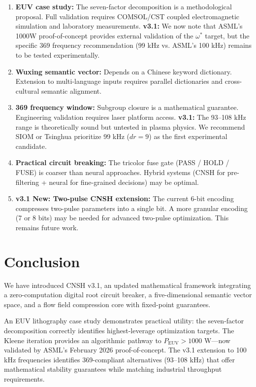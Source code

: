 \documentclass[twocolumn]{article}
\begin{document}
\begin{enumerate}
  \item \textbf{EUV case study:} The seven-factor decomposition is a methodological proposal. Full validation requires COMSOL/CST coupled electromagnetic simulation and laboratory measurements. \textbf{v3.1:} We now note that ASML's 1000W proof-of-concept provides external validation of the $\omega^*$ target, but the specific 369 frequency recommendation (99 kHz vs. ASML's 100 kHz) remains to be tested experimentally.

  \item \textbf{Wuxing semantic vector:} Depends on a Chinese keyword dictionary. Extension to multi-language inputs requires parallel dictionaries and cross-cultural semantic alignment.

  \item \textbf{369 frequency window:} Subgroup closure is a mathematical guarantee. Engineering validation requires laser platform access. \textbf{v3.1:} The 93–108 kHz range is theoretically sound but untested in plasma physics. We recommend SIOM or Tsinghua prioritize 99 kHz ($dr=9$) as the first experimental candidate.

  \item \textbf{Practical circuit breaking:} The tricolor fuse gate (PASS / HOLD / FUSE) is coarser than neural approaches. Hybrid systems (CNSH for pre-filtering + neural for fine-grained decisions) may be optimal.

  \item \textbf{v3.1 New: Two-pulse CNSH extension:} The current 6-bit encoding compresses two-pulse parameters into a single bit. A more granular encoding (7 or 8 bits) may be needed for advanced two-pulse optimization. This remains future work.
\end{enumerate}

\section{Conclusion}

We have introduced CNSH v3.1, an updated mathematical framework integrating a zero-computation digital root circuit breaker, a five-dimensional semantic vector space, and a flow field compression core with fixed-point guarantees.

An EUV lithography case study demonstrates practical utility: the seven-factor decomposition correctly identifies highest-leverage optimization targets. The Kleene iteration provides an algorithmic pathway to $P_{\text{EUV}} > 1000$ W—now validated by ASML's February 2026 proof-of-concept. The v3.1 extension to 100 kHz frequencies identifies 369-compliant alternatives (93–108 kHz) that offer mathematical stability guarantees while matching industrial throughput requirements.
\end{document}
